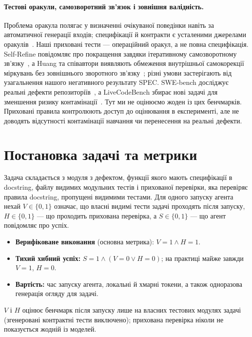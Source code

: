 \documentclass[11pt]{article}
\begin{document}
\paragraph{Тестові оракули, самозворотний зв’язок і зовнішня валідність.} Проблема оракула полягає у визначенні очікуваної поведінки навіть за автоматичної генерації входів; специфікації й контракти є усталеними джерелами оракулів~\citep{barr2015oracle}. Наші приховані тести --- операційний оракул, а не повна специфікація. Self-Refine повідомляє про покращення завдяки ітеративному самозворотному зв’язку~\citep{madaan2023selfrefine}, а Huang та співавтори виявляють обмеження внутрішньої самокорекції міркувань без зовнішнього зворотного зв’язку~\citep{huang2024selfcorrect}; різні умови застерігають від узагальнення нашого негативного результату SPEC. SWE-bench досліджує реальні дефекти репозиторіїв~\citep{jimenez2024swebench}, а LiveCodeBench збирає нові задачі для зменшення ризику контамінації~\citep{jain2024livecodebench}. Тут ми не оцінюємо жоден із цих бенчмарків. Приховані правила контролюють доступ до оцінювання в експерименті, але не доводять відсутності контамінації навчання чи перенесення на реальні дефекти.

\section{Постановка задачі та метрики}\label{sec:problem}
Задача складається з модуля з дефектом, функції якого мають специфікації в docstring, файлу видимих модульних тестів і прихованої перевірки, яка перевіряє правила docstring, пропущені видимими тестами. Для одного запуску агента нехай $V\in\{0,1\}$ означає, що власні видимі тести задачі проходять після запуску, $H\in\{0,1\}$ --- що проходить прихована перевірка, а $S\in\{0,1\}$ --- що агент повідомляє про успіх.
\begin{itemize}
\item \textbf{Верифіковане виконання} (основна метрика): $V=1\land H=1$.
\item \textbf{Тихий хибний успіх:} $S=1\land(V=0\lor H=0)$; на практиці майже завжди $V=1$, $H=0$.
\item \textbf{Вартість:} час запуску агента, локальні й хмарні токени, а також одноразова генерація огляду для задачі.
\end{itemize}
$V$ і $H$ оцінює бенчмарк після запуску лише на власних тестових модулях задачі (згенеровані контрактні тести виключено); прихована перевірка ніколи не показується жодній із моделей.
\end{document}
